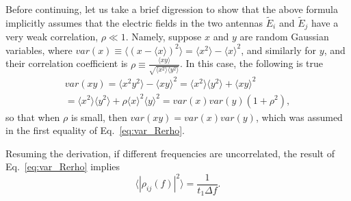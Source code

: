 \documentclass[12pt]{paper}
\newcommand{\beq}{\begin{equation}}
\newcommand{\eeq}{\end{equation}}
\newcommand{\bga}{\begin{gathered}}
\newcommand{\ega}{\end{gathered}}
\begin{document}
Before continuing, let us take a brief digression to show that the above formula implicitly assumes that the electric fields in the two antennas $\widetilde E_i$ and $\widetilde E_j$ have a very weak correlation, $\rho\ll 1$. Namely, suppose $x$ and $y$ are random Gaussian variables, where $var(x)\equiv\langle(x-\langle x\rangle)^2\rangle = \langle x^2\rangle - \langle x \rangle^2$, and similarly for $y$, and their correlation coefficient is $\rho\equiv \frac{\langle xy\rangle}{\sqrt{\langle x^2\rangle \langle y^2\rangle}}$. In this case, the following is true
\beq
\bga
var(xy) = \langle x^2y^2\rangle -  \langle xy \rangle^2 = 
\langle x^2\rangle \langle y^2\rangle + \langle xy\rangle^2\\
=\langle x^2\rangle \langle y^2\rangle+\rho \langle x\rangle^2\langle y\rangle^2=var(x)var(y)(1+\rho^2),
\ega
\eeq
so that when $\rho$ is small, then $var(xy)=var(x)var(y)$, which was assumed in the first equality of Eq.~\ref{eq:var_Rerho}.

Resuming the derivation, if different frequencies are uncorrelated, the result of Eq.~\ref{eq:var_Rerho} implies
\beq
\langle|\rho_{ij}(f)|^2\rangle = \frac{1}{t_1\Delta f}.
\label{eq:var_rho}
\eeq
\end{document}
